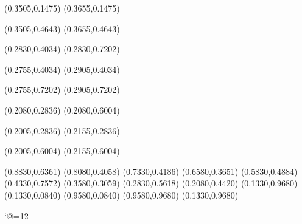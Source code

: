 \PST@Solid(0.3505,0.1475)
(0.3655,0.1475)

\PST@Solid(0.3505,0.4643)
(0.3655,0.4643)

\PST@Solid(0.2830,0.4034)
(0.2830,0.7202)

\PST@Solid(0.2755,0.4034)
(0.2905,0.4034)

\PST@Solid(0.2755,0.7202)
(0.2905,0.7202)

\PST@Solid(0.2080,0.2836)
(0.2080,0.6004)

\PST@Solid(0.2005,0.2836)
(0.2155,0.2836)

\PST@Solid(0.2005,0.6004)
(0.2155,0.6004)

\PST@Diamond(0.8830,0.6361)
\PST@Diamond(0.8080,0.4058)
\PST@Diamond(0.7330,0.4186)
\PST@Diamond(0.6580,0.3651)
\PST@Diamond(0.5830,0.4884)
\PST@Diamond(0.4330,0.7572)
\PST@Diamond(0.3580,0.3059)
\PST@Diamond(0.2830,0.5618)
\PST@Diamond(0.2080,0.4420)
\PST@Border(0.1330,0.9680)
(0.1330,0.0840)
(0.9580,0.0840)
(0.9580,0.9680)
(0.1330,0.9680)

\catcode`@=12
\fi
\endpspicture
